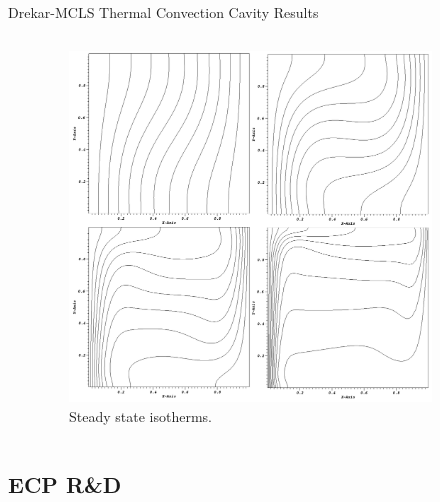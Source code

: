 \documentclass{beamer}
\begin{document}
\begin{frame}{Drekar-MCLS Thermal Convection Cavity Results}
\begin{columns}
\begin{column}{0.6\textwidth}
    \end{column}
    \begin{column}{0.4\textwidth}
      \vspace{-0.4in}
      \begin{figure}
        \centering
        \includegraphics[width=0.9\textwidth]{convection_isotherms}
        \caption{Steady state isotherms.}
      \end{figure}
    \end{column}

  \end{columns}

\end{frame}

\subsection{ECP R\&D}
\end{document}
